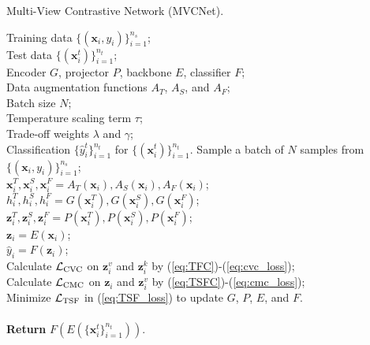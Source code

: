 \documentclass[journal]{IEEEtran}
\begin{document}
\begin{algorithm}[tb]
    \caption{Multi-View Contrastive Network (MVCNet).}
    \label{alg:MVCNet}
        \begin{algorithmic}%
\REQUIRE Training data $\{(\mathbf{x}_i, y_i)\}_{i=1}^{n_s}$;\\
Test data $\{(\mathbf{x}_i^t)\}_{i=1}^{n_t}$;\\
Encoder $G$, projector $P$, backbone $E$, classifier $F$;\\
Data augmentation functions $A_T$, $A_S$, and $A_F$;\\
Batch size $N$;\\
Temperature scaling term $\tau$;\\
Trade-off weights $\lambda$ and $\gamma$;\\
\ENSURE Classification $\{\hat{y}_i^t\}_{i=1}^{n_t}$ for $\{(\mathbf{x}_i^t)\}_{i=1}^{n_t}$.
        \STATE Sample a batch of $N$ samples from $\{(\mathbf{x}_i, y_i)\}_{i=1}^{n_s}$;\\
        \STATE $\mathbf{x}_i^T, \mathbf{x}_i^S, \mathbf{x}_i^F=A_T(\mathbf{x}_i), A_S(\mathbf{x}_i), A_F(\mathbf{x}_i)$;\\
        \STATE $h_i^T, h_i^S, h_i^F=G(\mathbf{x}_i^T), G(\mathbf{x}_i^S), G(\mathbf{x}_i^F)$;\\
        \STATE $\boldsymbol{z}_i^T, \boldsymbol{z}_i^S, \boldsymbol{z}_i^F=P(\mathbf{x}_i^T), P(\mathbf{x}_i^S), P(\mathbf{x}_i^F)$;\\
        \STATE $\boldsymbol{z}_i=E(\mathbf{x}_i)$;\\
        \STATE $\hat{y}_i=F(\boldsymbol{z}_i)$;\\
        \STATE Calculate $\mathcal{L}_\textmd{CVC}$ on $\boldsymbol{z}_i^v$ and $\boldsymbol{z}_i^k$ by (\ref{eq:TFC})-(\ref{eq:cvc_loss}); \\
        \STATE Calculate $\mathcal{L}_\textmd{CMC}$ on $\boldsymbol{z}_i$ and $\boldsymbol{z}_i^v$ by (\ref{eq:TSFC})-(\ref{eq:cmc_loss}); \\
        \STATE Minimize $\mathcal{L}_\textmd{TSF}$ in (\ref{eq:TSF_loss}) to update $G$, $P$, $E$, and $F$.\\
        \ENDWHILE \\
        \STATE \textbf{Return} $F(E(\{\mathbf{x}_i^t\}_{i=1}^{n_t}))$.\\
        \end{algorithmic}
\end{algorithm}
\end{document}

